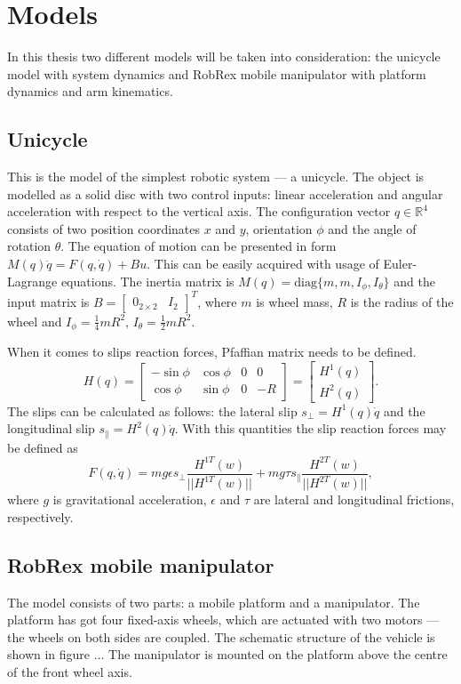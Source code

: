 \chapter{Models}
\label{ch:model}
In this thesis two different models will be taken into consideration: the unicycle model with system dynamics and RobRex mobile manipulator with platform dynamics and arm kinematics.
\section{Unicycle}
This is the model of the simplest robotic system --- a unicycle. The object is modelled as a solid disc with two control inputs: linear acceleration and angular acceleration with respect to the vertical axis. The configuration vector $q\in \mathbb{R}^4$ consists of two position coordinates $x$ and $y$, orientation $\phi$ and the angle of rotation $\theta$. The equation of motion can be presented in form $M(q)\ddot q =F(q, \dot q)+Bu$. This can be easily acquired with usage of Euler-Lagrange equations. The inertia matrix is $M(q)=\mathrm{diag}\{m, m, I_\phi, I_\theta\}$ and the input matrix is $B=\begin{bmatrix}
0_{2 \times 2} & I_2
\end{bmatrix}^T$, where $m$ is wheel mass, $R$ is the radius of the wheel and $I_\phi=\frac{1}{4}mR^2$, $I_\theta=\frac{1}{2}mR^2$.

When it comes to slips reaction forces, Pfaffian matrix needs to be defined.
\begin{equation}
H(q)=\begin{bmatrix}
-\sin\phi & \cos\phi & 0 & 0\\
\cos\phi & \sin\phi & 0 & -R
\end{bmatrix}=\begin{bmatrix}
H^1(q)\\
H^2(q)
\end{bmatrix}.
\end{equation}
The slips can be calculated as follows: the lateral slip $s_\perp=H^1(q)\dot q$ and the longitudinal slip $s_\parallel=H^2(q)\dot q$. With this quantities the slip reaction forces may be defined as 
\begin{equation}
F(q, \dot q)=mg\epsilon s_\perp\frac{H^{1T}(w)}{||H^{1T}(w)||} + mg\tau s_\parallel\frac{H^{2T}(w)}{||H^{2T}(w)||},
\end{equation}
where $g$ is gravitational acceleration, $\epsilon$ and $\tau$ are lateral and longitudinal frictions, respectively.
\section{RobRex mobile manipulator}
The model consists of two parts: a mobile platform and a manipulator. The platform has got four fixed-axis wheels, which are actuated with two motors --- the wheels on both sides are coupled. The schematic structure of the vehicle is shown in figure ... %
The manipulator is mounted on the platform above the centre of the front wheel axis.
